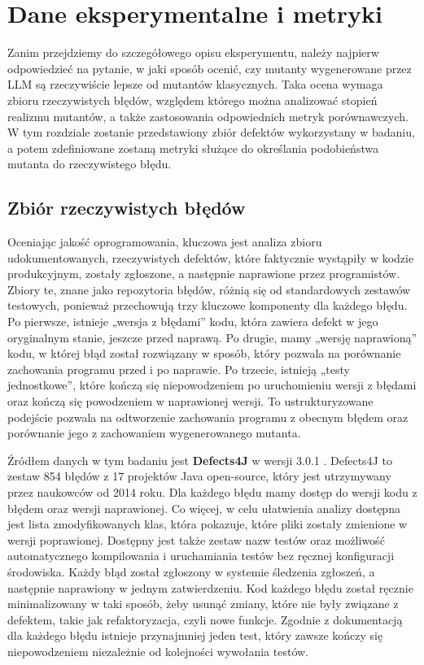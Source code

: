 \documentclass[12pt,a4paper,oldfontcommands]{memoir}
\theoremstyle{plain}
\theoremstyle{definition}
\theoremstyle{remark}
\begin{document}
    \clearpage
    \openany
    \chapter{Dane eksperymentalne i metryki}
    \openright

    Zanim przejdziemy do szczegółowego opisu eksperymentu, należy najpierw odpowiedzieć na pytanie, w jaki sposób ocenić, czy mutanty wygenerowane przez LLM są rzeczywiście lepsze od mutantów klasycznych.
    Taka ocena wymaga zbioru rzeczywistych błędów, względem którego można analizować stopień realizmu mutantów, a także zastosowania odpowiednich metryk porównawczych.
    W tym rozdziale zostanie przedstawiony zbiór defektów wykorzystany w badaniu, a potem zdefiniowane zostaną metryki służące do określania podobieństwa mutanta do rzeczywistego błędu.

    \section{Zbiór rzeczywistych błędów}

    Oceniając jakość oprogramowania, kluczowa jest analiza zbioru udokumentowanych, rzeczywistych defektów, które faktycznie wystąpiły w kodzie produkcyjnym, zostały zgłoszone, a następnie naprawione przez programistów.
    Zbiory te, znane jako repozytoria błędów, różnią się od standardowych zestawów testowych, ponieważ przechowują trzy kluczowe komponenty dla każdego błędu.
    Po pierwsze, istnieje „wersja z błędami” kodu, która zawiera defekt w jego oryginalnym stanie, jeszcze przed naprawą.
    Po drugie, mamy „wersję naprawioną” kodu, w której błąd został rozwiązany w sposób, który pozwala na porównanie zachowania programu przed i po naprawie.
    Po trzecie, istnieją „testy jednostkowe”, które kończą się niepowodzeniem po uruchomieniu wersji z błędami oraz kończą się powodzeniem w naprawionej wersji.
    To ustrukturyzowane podejście pozwala na odtworzenie zachowania programu z obecnym błędem oraz porównanie jego z zachowaniem wygenerowanego mutanta.

    Źródłem danych w tym badaniu jest \textbf{Defects4J} w wersji 3.0.1 \cite{ref3}.
    Defects4J to zestaw 854 błędów z 17 projektów Java open-source, który jest utrzymywany przez naukowców od 2014 roku.
    Dla każdego błędu mamy dostęp do wersji kodu z błędem oraz wersji naprawionej.
    Co więcej, w celu ułatwienia analizy dostępna jest lista zmodyfikowanych klas, która pokazuje, które pliki zostały zmienione w wersji poprawionej.
    Dostępny jest także zestaw nazw testów oraz możliwość automatycznego kompilowania i uruchamiania testów bez ręcznej konfiguracji środowiska.
    Każdy błąd został zgłoszony w systemie śledzenia zgłoszeń, a następnie naprawiony w jednym zatwierdzeniu.
    Kod każdego błędu został ręcznie minimalizowany w taki sposób, żeby usunąć zmiany, które nie były związane z defektem, takie jak refaktoryzacja, czyli nowe funkcje.
    Zgodnie z dokumentacją dla każdego błędu istnieje przynajmniej jeden test, który zawsze kończy się niepowodzeniem niezależnie od kolejności wywołania testów.
\end{document}
